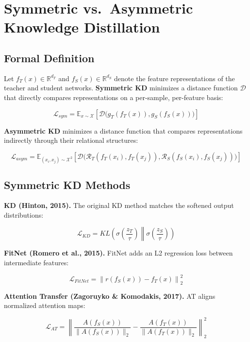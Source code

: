 \documentclass[symmetry,article,submit,pdftex,moreauthors]{Definitions/mdpi}
\begin{document}
\section{Symmetric vs.~Asymmetric Knowledge Distillation}

\subsection{Formal Definition}

Let $f_T(x) \in \mathbb{R}^{d_T}$ and $f_S(x) \in \mathbb{R}^{d_S}$ denote the feature representations of the teacher and student networks. \textbf{Symmetric KD} minimizes a distance function $\mathcal{D}$ that directly compares representations on a per-sample, per-feature basis:

\begin{equation}
\mathcal{L}_{sym} = \mathbb{E}_{x \sim \mathcal{X}} \left[ \mathcal{D}\big(g_T(f_T(x)), g_S(f_S(x))\big) \right]
\end{equation}

\textbf{Asymmetric KD} minimizes a distance function that compares representations indirectly through their relational structures:

\begin{equation}
\mathcal{L}_{asym} = \mathbb{E}_{(x_i, x_j) \sim \mathcal{X}^2} \left[ \mathcal{D}\big(\mathcal{R}_T(f_T(x_i), f_T(x_j)), \mathcal{R}_S(f_S(x_i), f_S(x_j))\big) \right]
\end{equation}

\subsection{Symmetric KD Methods}

\textbf{KD (Hinton, 2015).} The original KD method matches the softened output distributions:

$$\mathcal{L}_{KD} = KL\left(\sigma\left(\frac{z_T}{\tau}\right) \middle\| \sigma\left(\frac{z_S}{\tau}\right) \right)$$

\textbf{FitNet (Romero et al., 2015).} FitNet adds an L2 regression loss between intermediate features:

$$\mathcal{L}_{FitNet} = \left\| r(f_S(x)) - f_T(x) \right\|_2^2$$

\textbf{Attention Transfer (Zagoruyko \& Komodakis, 2017).} AT aligns normalized attention maps:

$$\mathcal{L}_{AT} = \left\| \frac{A(f_S(x))}{\|A(f_S(x))\|_2} - \frac{A(f_T(x))}{\|A(f_T(x))\|_2} \right\|_2^2$$
\end{document}
